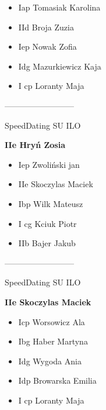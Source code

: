 \documentclass[a4paper,10pt]{article}
\begin{document}
\begin{multicols}{3}
\begin{minipage}[l]{\textwidth}
  \begin{itemize}
    \item Iap Tomasiak Karolina
    \item IId Broja Zuzia
    \item Iep Nowak Zofia
    \item Idg Mazurkiewicz Kaja
    \item I cp Loranty Maja

    \end{itemize}



\end{minipage}



\begin{minipage}[l]{\textwidth}
--------------------------

  \footnotesize{SpeedDating SU ILO}

  \bfseries{IIe Hryń Zosia}

  \begin{itemize}
    \item Iep Zwoliński jan
    \item IIe Skoczylas Maciek
    \item Ibp Wilk Mateusz
    \item I cg Kciuk Piotr
    \item IIb Bajer Jakub

    \end{itemize}



\end{minipage}



\begin{minipage}[l]{\textwidth}
--------------------------

  \footnotesize{SpeedDating SU ILO}

  \bfseries{IIe Skoczylas Maciek}

  \begin{itemize}
    \item Icp Worsowicz Ala
    \item Ibg Haber Martyna
    \item Idg Wygoda Ania
    \item Idp Browarska Emilia
    \item I cp Loranty Maja

    \end{itemize}



\end{minipage}




\end{multicols}
\end{document}
